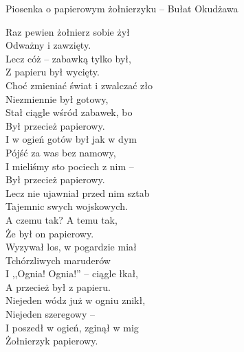 \begin{piosenka}{Piosenka o papierowym żołnierzyku -- Bułat Okudżawa}
	
Raz pewien żołnierz sobie żył \\
Odważny i zawzięty. \\
Lecz cóż -- zabawką tylko był, \\
Z papieru był wycięty. \\[\zwrotkaspace]

Choć zmieniać świat i zwalczać zło \\
Niezmiennie był gotowy, \\
Stał ciągle wśród zabawek, bo \\
Był przecież papierowy. \\[\zwrotkaspace]

I w ogień gotów był jak w dym \\
Pójść za was bez namowy, \\
I mieliśmy sto pociech z nim -- \\
Był przecież papierowy. \\[\zwrotkaspace]

Lecz nie ujawniał przed nim sztab \\
Tajemnic swych wojskowych. \\
A czemu tak? A temu tak, \\ 
Że był on papierowy. \\[\zwrotkaspace]

Wyzywał los, w pogardzie miał \\
Tchórzliwych maruderów \\
I ,,Ognia! Ognia!'' -- ciągle łkał, \\
A przecież był z papieru. \\[\zwrotkaspace]

Niejeden wódz już w ogniu znikł, \\
Niejeden szeregowy -- \\
I poszedł w ogień, zginął w mig \\
Żołnierzyk papierowy. \\

\end{piosenka}